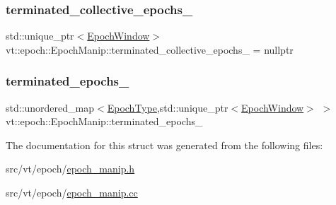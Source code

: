 \subsubsection{\texorpdfstring{terminated\+\_\+collective\+\_\+epochs\+\_\+}{terminated\_collective\_epochs\_}}
{\footnotesize\ttfamily std\+::unique\+\_\+ptr$<$\hyperlink{structvt_1_1epoch_1_1_epoch_window}{Epoch\+Window}$>$ vt\+::epoch\+::\+Epoch\+Manip\+::terminated\+\_\+collective\+\_\+epochs\+\_\+ = nullptr\hspace{0.3cm}{\ttfamily [private]}}

\mbox{\label{structvt_1_1epoch_1_1_epoch_manip_aae06cc3b0a36114406ff318045d1c3fa}} 
\subsubsection{\texorpdfstring{terminated\+\_\+epochs\+\_\+}{terminated\_epochs\_}}
{\footnotesize\ttfamily std\+::unordered\+\_\+map$<$\hyperlink{namespacevt_a985a5adf291c34a3ca263b3378388236}{Epoch\+Type},std\+::unique\+\_\+ptr$<$\hyperlink{structvt_1_1epoch_1_1_epoch_window}{Epoch\+Window}$>$ $>$ vt\+::epoch\+::\+Epoch\+Manip\+::terminated\+\_\+epochs\+\_\+\hspace{0.3cm}{\ttfamily [private]}}



The documentation for this struct was generated from the following files\+:\begin{DoxyCompactItemize}
\item 
src/vt/epoch/\hyperlink{epoch__manip_8h}{epoch\+\_\+manip.\+h}\item 
src/vt/epoch/\hyperlink{epoch__manip_8cc}{epoch\+\_\+manip.\+cc}\end{DoxyCompactItemize}
